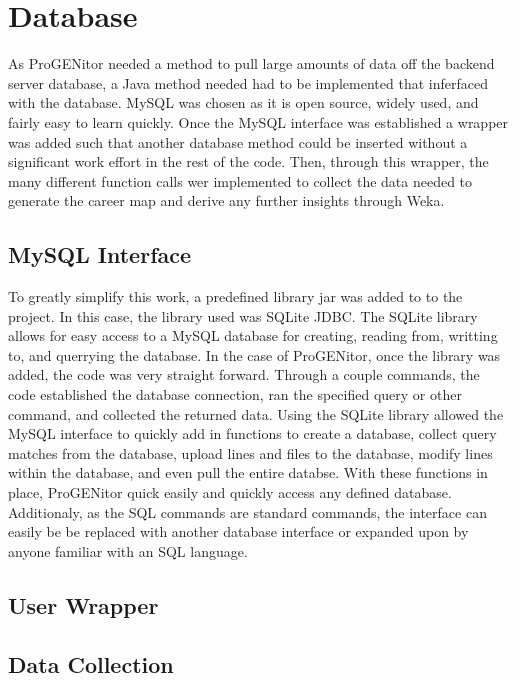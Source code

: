 \section{Database}
\label{sect:database}
As ProGENitor needed a method to pull large amounts of data off the backend
server database, a Java method needed had to be implemented that inferfaced with
the database.  MySQL was chosen as it is open source, widely used, and fairly
easy to learn quickly.  Once the MySQL interface was established a wrapper was
added such that another database method could be inserted without a significant
work effort in the rest of the code.  Then, through this wrapper, the many
different function calls wer implemented to collect the data needed to generate
the career map and derive any further insights through Weka.

\subsection{MySQL Interface}
To greatly simplify this work, a predefined library jar was added
to to the project.  In this case, the library used was SQLite JDBC.  The SQLite
library allows for easy access to a MySQL database for creating, reading from,
writting to, and querrying the database.  In the case of ProGENitor, once the
library was added, the code was very straight forward.  Through a couple
commands, the code established the database connection, ran the specified query
or other command, and collected the returned data.\cite{sqlite}  Using the
SQLite library allowed the MySQL interface to quickly add in functions to create
a database, collect query matches from the database, upload lines and files to
the database, modify lines within the database, and even pull the entire
databse.  With these functions in place, ProGENitor quick easily and quickly
access any defined database.  Additionaly, as the SQL commands are standard
commands, the interface can easily be be replaced with another database
interface or expanded upon by anyone familiar with an SQL language.

\subsection{User Wrapper}


\subsection{Data Collection}

